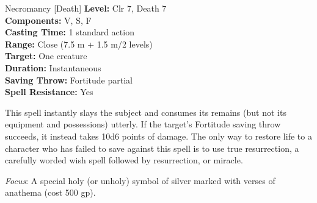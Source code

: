 {Necromancy [Death]}
{
	\textbf{Level:}
	Clr 7, Death 7\\
	\textbf{Components:}
	V, S, F\\
	\textbf{Casting Time:}
	1 standard action\\
	\textbf{Range:}
	Close (7.5 m + 1.5 m/2 levels)\\
	\textbf{Target:}
	One creature\\
	\textbf{Duration:}
	Instantaneous\\
	\textbf{Saving Throw:}
	Fortitude partial\\
	\textbf{Spell Resistance:}
	Yes\\
}
{
	This spell instantly slays the subject and consumes its remains (but not its equipment and possessions) utterly. If the target's Fortitude saving throw succeeds, it instead takes 10d6 points of damage. The only way to restore life to a character who has failed to save against this spell is to use true resurrection, a carefully worded wish spell followed by resurrection, or miracle.

	\textit{Focus}:
	A special holy (or unholy) symbol of silver marked with verses of anathema (cost 500 gp).

}

